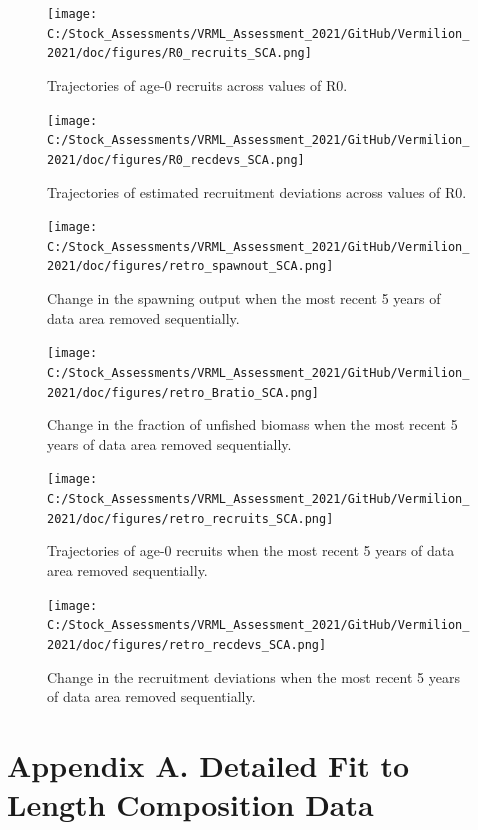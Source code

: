 \documentclass[11pt,
  english,
]{article}
\begin{document}
\begin{figure}
\centering
\texttt{[image: C:/Stock\_Assessments/VRML\_Assessment\_2021/GitHub/Vermilion\_2021/doc/figures/R0\_recruits\_SCA.png]}
\caption{Trajectories of age-0 recruits across values of R0.\label{fig:r0-recruits}}
\end{figure}

\begin{figure}
\centering
\texttt{[image: C:/Stock\_Assessments/VRML\_Assessment\_2021/GitHub/Vermilion\_2021/doc/figures/R0\_recdevs\_SCA.png]}
\caption{Trajectories of estimated recruitment deviations across values of R0.\label{fig:r0-recdevs}}
\end{figure}

\begin{figure}
\centering
\texttt{[image: C:/Stock\_Assessments/VRML\_Assessment\_2021/GitHub/Vermilion\_2021/doc/figures/retro\_spawnout\_SCA.png]}
\caption{Change in the spawning output when the most recent 5 years of data area removed sequentially.\label{fig:retro-spawnb}}
\end{figure}

\begin{figure}
\centering
\texttt{[image: C:/Stock\_Assessments/VRML\_Assessment\_2021/GitHub/Vermilion\_2021/doc/figures/retro\_Bratio\_SCA.png]}
\caption{Change in the fraction of unfished biomass when the most recent 5 years of data area removed sequentially.\label{fig:retro-bratio}}
\end{figure}

\begin{figure}
\centering
\texttt{[image: C:/Stock\_Assessments/VRML\_Assessment\_2021/GitHub/Vermilion\_2021/doc/figures/retro\_recruits\_SCA.png]}
\caption{Trajectories of age-0 recruits when the most recent 5 years of data area removed sequentially.\label{fig:retro-recruits}}
\end{figure}

\begin{figure}
\centering
\texttt{[image: C:/Stock\_Assessments/VRML\_Assessment\_2021/GitHub/Vermilion\_2021/doc/figures/retro\_recdevs\_SCA.png]}
\caption{Change in the recruitment deviations when the most recent 5 years of data area removed sequentially.\label{fig:retro-recdevs}}
\end{figure}

\newpage


\hypertarget{appendix-a.-detailed-fit-to-length-composition-data}{%
\section*{Appendix A. Detailed Fit to Length Composition Data}\label{appendix-a.-detailed-fit-to-length-composition-data}}
\end{document}
